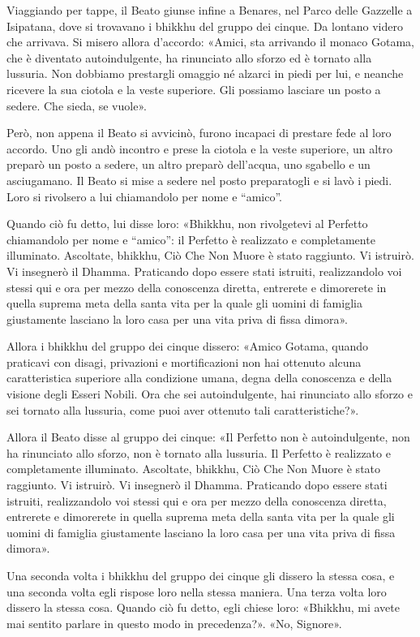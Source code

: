 Viaggiando per tappe, il Beato giunse infine a Benares, nel Parco delle Gazzelle
a Isipatana, dove si trovavano i bhikkhu del gruppo dei cinque. Da lontano
videro che arrivava. Si misero allora d’accordo: «Amici, sta arrivando il monaco
Gotama, che è diventato autoindulgente, ha rinunciato allo sforzo ed è tornato
alla lussuria. Non dobbiamo prestargli omaggio né alzarci in piedi per lui, e
neanche ricevere la sua ciotola e la veste superiore. Gli possiamo lasciare un
posto a sedere. Che sieda, se vuole».

Però, non appena il Beato si avvicinò, furono incapaci di prestare fede al loro
accordo. Uno gli andò incontro e prese la ciotola e la veste superiore, un altro
preparò un posto a sedere, un altro preparò dell’acqua, uno sgabello e un
asciugamano. Il Beato si mise a sedere nel posto preparatogli e si lavò i piedi.
Loro si rivolsero a lui chiamandolo per nome e “amico”.

Quando ciò fu detto, lui disse loro: «Bhikkhu, non rivolgetevi al Perfetto
chiamandolo per nome e “amico”: il Perfetto è realizzato e completamente
illuminato. Ascoltate, bhikkhu, Ciò Che Non Muore è stato raggiunto. Vi
istruirò. Vi insegnerò il Dhamma. Praticando dopo essere stati istruiti,
realizzandolo voi stessi qui e ora per mezzo della conoscenza diretta, entrerete
e dimorerete in quella suprema meta della santa vita per la quale gli uomini di
famiglia giustamente lasciano la loro casa per una vita priva di fissa dimora».

Allora i bhikkhu del gruppo dei cinque dissero: «Amico Gotama, quando praticavi
con disagi, privazioni e mortificazioni non hai ottenuto alcuna caratteristica
superiore alla condizione umana, degna della conoscenza e della visione degli
Esseri Nobili. Ora che sei autoindulgente, hai rinunciato allo sforzo e sei
tornato alla lussuria, come puoi aver ottenuto tali caratteristiche?».

Allora il Beato disse al gruppo dei cinque: «Il Perfetto non è autoindulgente,
non ha rinunciato allo sforzo, non è tornato alla lussuria. Il Perfetto è
realizzato e completamente illuminato. Ascoltate, bhikkhu, Ciò Che Non Muore è
stato raggiunto. Vi istruirò. Vi insegnerò il Dhamma. Praticando dopo essere
stati istruiti, realizzandolo voi stessi qui e ora per mezzo della conoscenza
diretta, entrerete e dimorerete in quella suprema meta della santa vita per la
quale gli uomini di famiglia giustamente lasciano la loro casa per una vita
priva di fissa dimora».

Una seconda volta i bhikkhu del gruppo dei cinque gli dissero la stessa cosa, e
una seconda volta egli rispose loro nella stessa maniera. Una terza volta loro
dissero la stessa cosa. Quando ciò fu detto, egli chiese loro: «Bhikkhu, mi
avete mai sentito parlare in questo modo in precedenza?». «No, Signore».

